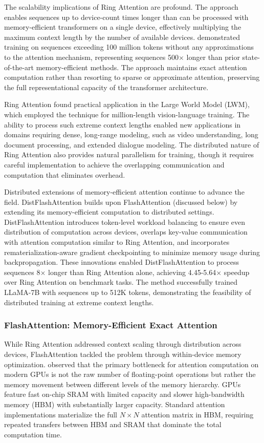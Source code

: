 \documentclass[11pt,letterpaper]{article}
\begin{document}
The scalability implications of Ring Attention are profound. The approach enables sequences up to device-count times longer than can be processed with memory-efficient transformers on a single device, effectively multiplying the maximum context length by the number of available devices. \cite{liu2023ring} demonstrated training on sequences exceeding 100 million tokens without any approximations to the attention mechanism, representing sequences 500$\times$ longer than prior state-of-the-art memory-efficient methods. The approach maintains exact attention computation rather than resorting to sparse or approximate attention, preserving the full representational capacity of the transformer architecture.

Ring Attention found practical application in the Large World Model (LWM), which employed the technique for million-length vision-language training. The ability to process such extreme context lengths enabled new applications in domains requiring dense, long-range modeling, such as video understanding, long document processing, and extended dialogue modeling. The distributed nature of Ring Attention also provides natural parallelism for training, though it requires careful implementation to achieve the overlapping communication and computation that eliminates overhead.

Distributed extensions of memory-efficient attention continue to advance the field. DistFlashAttention builds upon FlashAttention (discussed below) by extending its memory-efficient computation to distributed settings. DistFlashAttention introduces token-level workload balancing to ensure even distribution of computation across devices, overlaps key-value communication with attention computation similar to Ring Attention, and incorporates rematerialization-aware gradient checkpointing to minimize memory usage during backpropagation. These innovations enabled DistFlashAttention to process sequences 8$\times$ longer than Ring Attention alone, achieving 4.45-5.64$\times$ speedup over Ring Attention on benchmark tasks. The method successfully trained LLaMA-7B with sequences up to 512K tokens, demonstrating the feasibility of distributed training at extreme context lengths.

\subsubsection{FlashAttention: Memory-Efficient Exact Attention}

While Ring Attention addressed context scaling through distribution across devices, FlashAttention tackled the problem through within-device memory optimization. \cite{dao2022flashattention} observed that the primary bottleneck for attention computation on modern GPUs is not the raw number of floating-point operations but rather the memory movement between different levels of the memory hierarchy. GPUs feature fast on-chip SRAM with limited capacity and slower high-bandwidth memory (HBM) with substantially larger capacity. Standard attention implementations materialize the full $N \times N$ attention matrix in HBM, requiring repeated transfers between HBM and SRAM that dominate the total computation time.
\end{document}
